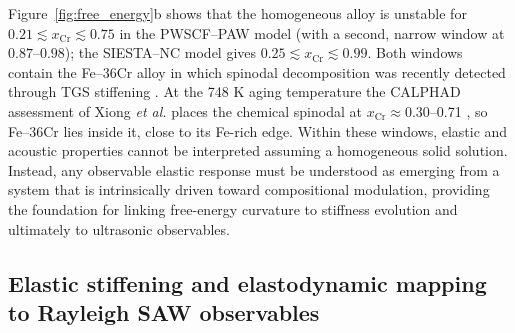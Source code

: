 \documentclass[final,3p,times]{elsarticle}
\begin{document}
Figure~\ref{fig:free_energy}b shows that the homogeneous alloy is unstable for $0.21 \lesssim x_{\mathrm{Cr}} \lesssim 0.75$ in the PWSCF--PAW model (with a second, narrow window at $0.87$--$0.98$); the SIESTA--NC model gives $0.25 \lesssim x_{\mathrm{Cr}} \lesssim 0.99$. Both windows contain the Fe--36Cr alloy in which spinodal decomposition was recently detected through TGS stiffening \cite{rae2026tgs}. At the 748 K aging temperature the CALPHAD assessment of Xiong \textit{et al.} places the chemical spinodal at $x_{\mathrm{Cr}}\approx0.30$--0.71 \cite{xiong2011improved}, so Fe--36Cr lies inside it, close to its Fe-rich edge. Within these windows, elastic and acoustic properties cannot be interpreted assuming a homogeneous solid solution. Instead, any observable elastic response must be understood as emerging from a system that is intrinsically driven toward compositional modulation, providing the foundation for linking free-energy curvature to stiffness evolution and ultimately to ultrasonic observables.

\subsection{Elastic stiffening and elastodynamic mapping to Rayleigh SAW observables}
\end{document}
